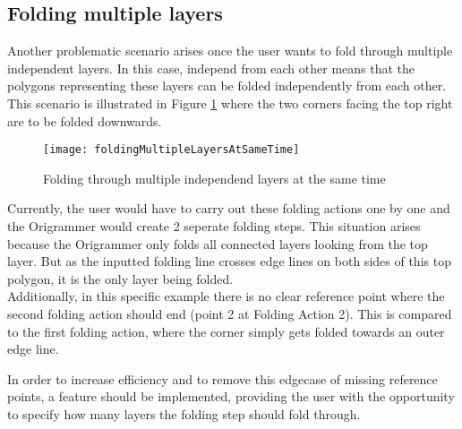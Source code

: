 \subsection{Folding multiple layers}

Another problematic scenario arises once the user wants to fold through multiple independent layers. In this case, independ from each other means that the polygons representing these layers can be folded independently from each other. This scenario is illustrated in Figure \ref{fig:foldingMultipleLayersAtSameTime} where the two corners facing the top right are to be folded downwards. 

\begin{figure}[htbp]
	\centering
	\texttt{[image: foldingMultipleLayersAtSameTime]}
	\caption{Folding through multiple independend layers at the same time}
	\label{fig:foldingMultipleLayersAtSameTime}
\end{figure}

\noindent Currently, the user would have to carry out these folding actions one by one and the Origrammer would create 2 seperate folding steps. This situation arises because the Origrammer only folds all connected layers looking from the top layer. But as the inputted folding line crosses edge lines on both sides of this top polygon, it is the only layer being folded.\\
Additionally, in this specific example there is no clear reference point where the second folding action should end (point 2 at Folding Action 2). This is compared to the first folding action, where the corner simply gets folded towards an outer edge line.


\noindent In order to increase efficiency and to remove this edgecase of missing reference points, a feature should be implemented, providing the user with the opportunity to specify how many layers the folding step should fold through.
